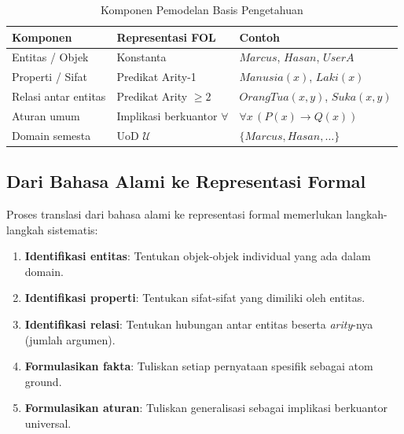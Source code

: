 \begin{table}[H]
\centering
\small
\renewcommand{\arraystretch}{1.3}
\begin{tabular}{|p{2.7cm}|p{3.6cm}|p{4.8cm}|}
\hline
\textbf{Komponen} & \textbf{Representasi FOL} & \textbf{Contoh} \\ \hline
Entitas / Objek & Konstanta & $Marcus$, $Hasan$, $UserA$ \\ \hline
Properti / Sifat & Predikat Arity-1 & $Manusia(x)$, $Laki(x)$ \\ \hline
Relasi antar entitas & Predikat Arity $\geq 2$ & $OrangTua(x,y)$, $Suka(x,y)$ \\ \hline
Aturan umum & Implikasi berkuantor $\forall$ & $\forall x\, (P(x) \rightarrow Q(x))$ \\ \hline
Domain semesta & UoD $\mathcal{U}$ & $\{Marcus, Hasan, \ldots\}$ \\ \hline
\end{tabular}
\caption{Komponen Pemodelan Basis Pengetahuan}
\label{tab:komponen-kb}
\end{table}

\subsection{Dari Bahasa Alami ke Representasi Formal}

Proses translasi dari bahasa alami ke representasi formal memerlukan langkah-langkah sistematis:

\begin{enumerate}
    \item \textbf{Identifikasi entitas}: Tentukan objek-objek individual yang ada dalam domain.
    \item \textbf{Identifikasi properti}: Tentukan sifat-sifat yang dimiliki oleh entitas.
    \item \textbf{Identifikasi relasi}: Tentukan hubungan antar entitas beserta \textit{arity}-nya (jumlah argumen).
    \item \textbf{Formulasikan fakta}: Tuliskan setiap pernyataan spesifik sebagai atom ground.
    \item \textbf{Formulasikan aturan}: Tuliskan generalisasi sebagai implikasi berkuantor universal.
\end{enumerate}

